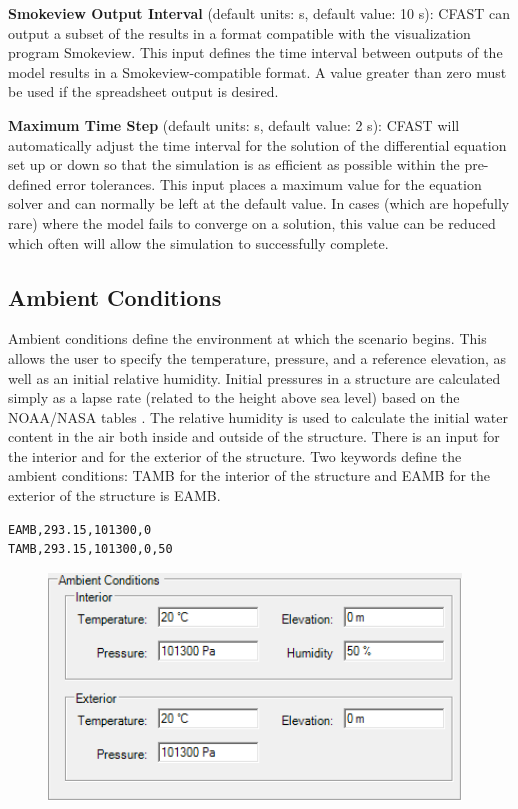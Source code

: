 \textbf{Smokeview Output Interval} (default units: s, default value: 10 s): CFAST can output a subset of the results in a format compatible with the visualization program Smokeview. This input defines the time interval between outputs of the model results in a Smokeview-compatible format.  A value greater than zero must be used if the spreadsheet output is desired.

\textbf{Maximum Time Step} (default units: s, default value: 2 s): CFAST will automatically adjust the time interval for the solution of the differential equation set up or down so that the simulation is as efficient as possible within the pre-defined error tolerances. This input places a maximum value for the equation solver and can normally be left at the default value. In cases (which are hopefully rare) where the model fails to converge on a solution, this value can be reduced which often will allow the simulation to successfully complete.

\subsection{Ambient Conditions}

Ambient conditions define the environment at which the scenario begins. This allows the user to specify the temperature, pressure, and a reference elevation, as well as an initial relative humidity.  Initial pressures in a structure are calculated simply as a lapse rate (related to the height above sea level) based on the NOAA/NASA tables \cite{GPO:Atmosphere}. The relative humidity is used to calculate the initial water content in the air both inside and outside of the structure.  There is an input for the interior and for the exterior of the structure.  Two keywords define the ambient conditions: TAMB for the interior of the structure and EAMB for the exterior of the structure is EAMB.

\begin{lstlisting}
EAMB,293.15,101300,0
TAMB,293.15,101300,0,50
\end{lstlisting}

\begin{figure}[h!]
\begin{center}
\includegraphics[width=4.313in]{FIGURES/Input_File/Ambient_Conditions}
\end{center}
\end{figure}

